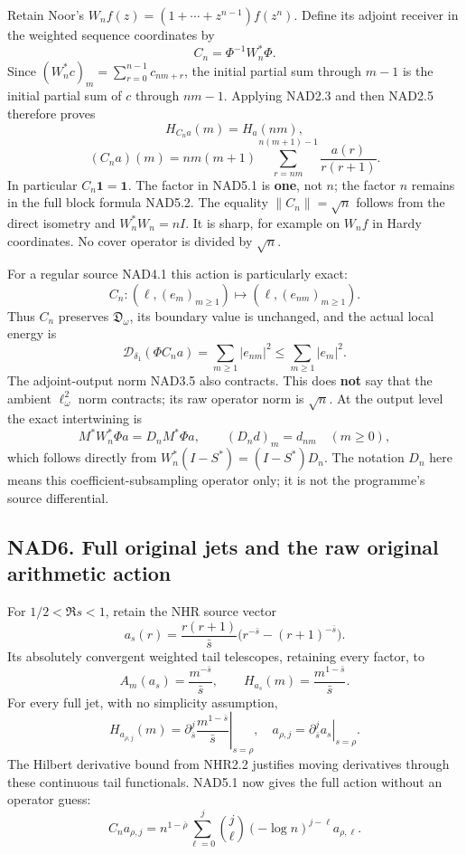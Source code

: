 Retain Noor's \(W_n f(z)=(1+\cdots+z^{n-1})f(z^n)\). Define its adjoint
receiver in the weighted sequence coordinates by \[
 C_n=\Phi^{-1}W_n^*\Phi.
\] Since \((W_n^*c)_m=\sum_{r=0}^{n-1}c_{nm+r}\), the initial partial
sum through \(m-1\) is the initial partial sum of \(c\) through
\(nm-1\). Applying NAD2.3 and then NAD2.5 therefore proves \[
 \boxed{H_{C_na}(m)=H_a(nm),}
 \tag{NAD5.1}
\] \[
 \boxed{(C_na)(m)=n m(m+1)
       \sum_{r=nm}^{n(m+1)-1}\frac{a(r)}{r(r+1)}.}
 \tag{NAD5.2}
\] In particular \(C_n\boldsymbol1=\boldsymbol1\). The factor in NAD5.1
is \textbf{one}, not \(n\); the factor \(n\) remains in the full block
formula NAD5.2. The equality \(\|C_n\|=\sqrt n\) follows from the direct
isometry and \(W_n^*W_n=nI\). It is sharp, for example on \(W_n f\) in
Hardy coordinates. No cover operator is divided by \(\sqrt n\).

For a regular source NAD4.1 this action is particularly exact: \[
 \boxed{C_n:(\ell,(e_m)_{m\ge1})\longmapsto
                 (\ell,(e_{nm})_{m\ge1}).}
 \tag{NAD5.3}
\] Thus \(C_n\) preserves \(\mathfrak D_\omega\), its boundary value is
unchanged, and the actual local energy is \[
 \mathcal D_{\delta_1}(\Phi C_na)
 =\sum_{m\ge1}|e_{nm}|^2\le\sum_{m\ge1}|e_m|^2.
 \tag{NAD5.4}
\] The adjoint-output norm NAD3.5 also contracts. This does \textbf{not}
say that the ambient \(\ell^2_\omega\) norm contracts; its raw operator
norm is \(\sqrt n\). At the output level the exact intertwining is \[
 M^*W_n^*\Phi a=D_n M^*\Phi a,
 \qquad (D_nd)_m=d_{nm}\quad(m\ge0),
 \tag{NAD5.5}
\] which follows directly from \(W_n^*(I-S^*)=(I-S^*)D_n\). The notation
\(D_n\) here means this coefficient-subsampling operator only; it is not
the programme's source differential.

\subsection{NAD6. Full original jets and the raw original arithmetic
action}\label{nad6.-full-original-jets-and-the-raw-original-arithmetic-action}

For \(1/2<\Re s<1\), retain the NHR source vector \[
 a_s(r)=\frac{r(r+1)}{\bar s}
             \bigl(r^{-\bar s}-(r+1)^{-\bar s}\bigr).
\] Its absolutely convergent weighted tail telescopes, retaining every
factor, to \[
 A_m(a_s)=\frac{m^{-\bar s}}{\bar s},\qquad
 \boxed{H_{a_s}(m)=\frac{m^{1-\bar s}}{\bar s}.}
 \tag{NAD6.1}
\] For every full jet, with no simplicity assumption, \[
 H_{a_{\rho,j}}(m)=
 \left.\partial_{\bar s}^{j}\frac{m^{1-\bar s}}{\bar s}\right|_{s=\rho},
 \quad a_{\rho,j}=\left.\partial_{\bar s}^{j}a_s\right|_{s=\rho}.
 \tag{NAD6.2}
\] The Hilbert derivative bound from NHR2.2 justifies moving derivatives
through these continuous tail functionals. NAD5.1 now gives the full
action without an operator guess: \[
 C_na_{\rho,j}=n^{1-\bar\rho}
      \sum_{\ell=0}^j\binom j\ell(-\log n)^{j-\ell}a_{\rho,\ell}.
 \tag{NAD6.3}
\]


